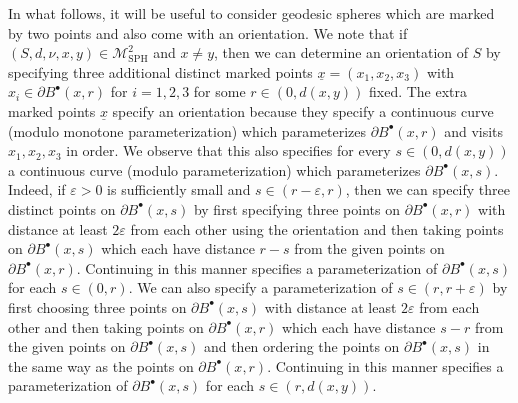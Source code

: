 \documentclass[10pt]{amsart}
\let\mathcal\mathscr
\newcommand{\sbullet}{{\scriptscriptstyle\bullet}}
\let\epsilon\varepsilon
\theoremstyle{plain}
\numberwithin{theorem}{section}
\theoremstyle{definition}
\newcommand\gmsspace{{\mathcal M}_{\mathrm{SPH}}}
\let\ul\underline
\newcommand{\fb}[2]{B^\sbullet(#1,#2)}
\begin{document}
In what follows, it will be useful to consider geodesic spheres which are marked by two points and also come with an orientation. We note that if $(S,d,\nu,x,y) \in \gmsspace^2$ and $x \neq y$, then we can determine an orientation of $S$ by specifying three additional distinct marked points $\ul{x}=(x_1,x_2,x_3)$ with $x_i \in \partial \fb{x}{r}$ for $i=1,2,3$ for some $r \in (0,d(x,y))$ fixed. The extra marked points $\ul{x}$ specify an orientation because they specify a continuous curve (modulo monotone parameterization) which parameterizes $\partial \fb{x}{r}$ and visits $x_1,x_2,x_3$ in order. We observe that this also specifies for every $s \in (0,d(x,y))$ a continuous curve (modulo parameterization) which parameterizes $\partial \fb{x}{s}$. Indeed, if $\epsilon > 0$ is sufficiently small and $s \in (r-\epsilon,r)$, then we can specify three distinct points on $\partial \fb{x}{s}$ by first specifying three points on $\partial \fb{x}{r}$ with distance at least $2 \epsilon$ from each other using the orientation and then taking points on $\partial \fb{x}{s}$ which each have distance $r-s$ from the given points on $\partial \fb{x}{r}$. Continuing in this manner specifies a parameterization of $\partial \fb{x}{s}$ for each $s \in (0,r)$. We can also specify a parameterization of $s \in (r,r+\epsilon)$ by first choosing three points on $\partial \fb{x}{s}$ with distance at least $2\epsilon$ from each other and then taking points on $\partial \fb{x}{r}$ which each have distance $s-r$ from the given points on $\partial \fb{x}{s}$ and then ordering the points on $\partial \fb{x}{s}$ in the same way as the points on $\partial \fb{x}{r}$. Continuing in this manner specifies a parameterization of $\partial \fb{x}{s}$ for each $s \in (r,d(x,y))$.
\end{document}
